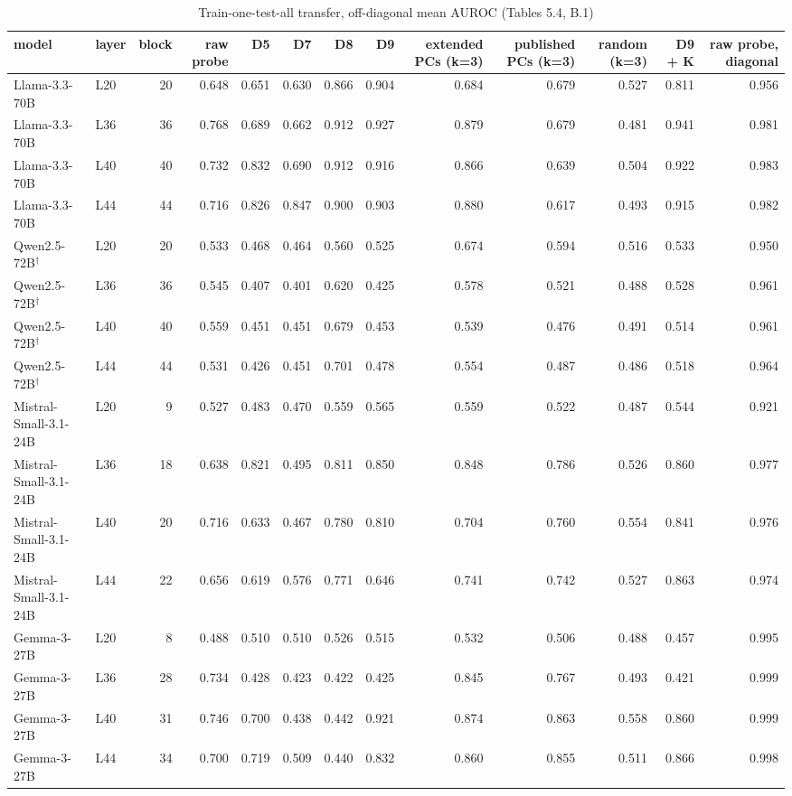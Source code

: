\begin{table}
\caption{Train-one-test-all transfer, off-diagonal mean AUROC (Tables 5.4, B.1)}
\label{tab:x-transfer}
\begin{tabular}{llrrrrrrrrrrr}
\toprule
model & layer & block & raw probe & D5 & D7 & D8 & D9 & extended PCs (k=3) & published PCs (k=3) & random (k=3) & D9 + K & raw probe, diagonal \\
\midrule
Llama-3.3-70B & L20 & 20 & 0.648 & 0.651 & 0.630 & 0.866 & 0.904 & 0.684 & 0.679 & 0.527 & 0.811 & 0.956 \\
Llama-3.3-70B & L36 & 36 & 0.768 & 0.689 & 0.662 & 0.912 & 0.927 & 0.879 & 0.679 & 0.481 & 0.941 & 0.981 \\
Llama-3.3-70B & L40 & 40 & 0.732 & 0.832 & 0.690 & 0.912 & 0.916 & 0.866 & 0.639 & 0.504 & 0.922 & 0.983 \\
Llama-3.3-70B & L44 & 44 & 0.716 & 0.826 & 0.847 & 0.900 & 0.903 & 0.880 & 0.617 & 0.493 & 0.915 & 0.982 \\
Qwen2.5-72B$^\dagger$ & L20 & 20 & 0.533 & 0.468 & 0.464 & 0.560 & 0.525 & 0.674 & 0.594 & 0.516 & 0.533 & 0.950 \\
Qwen2.5-72B$^\dagger$ & L36 & 36 & 0.545 & 0.407 & 0.401 & 0.620 & 0.425 & 0.578 & 0.521 & 0.488 & 0.528 & 0.961 \\
Qwen2.5-72B$^\dagger$ & L40 & 40 & 0.559 & 0.451 & 0.451 & 0.679 & 0.453 & 0.539 & 0.476 & 0.491 & 0.514 & 0.961 \\
Qwen2.5-72B$^\dagger$ & L44 & 44 & 0.531 & 0.426 & 0.451 & 0.701 & 0.478 & 0.554 & 0.487 & 0.486 & 0.518 & 0.964 \\
Mistral-Small-3.1-24B & L20 & 9 & 0.527 & 0.483 & 0.470 & 0.559 & 0.565 & 0.559 & 0.522 & 0.487 & 0.544 & 0.921 \\
Mistral-Small-3.1-24B & L36 & 18 & 0.638 & 0.821 & 0.495 & 0.811 & 0.850 & 0.848 & 0.786 & 0.526 & 0.860 & 0.977 \\
Mistral-Small-3.1-24B & L40 & 20 & 0.716 & 0.633 & 0.467 & 0.780 & 0.810 & 0.704 & 0.760 & 0.554 & 0.841 & 0.976 \\
Mistral-Small-3.1-24B & L44 & 22 & 0.656 & 0.619 & 0.576 & 0.771 & 0.646 & 0.741 & 0.742 & 0.527 & 0.863 & 0.974 \\
Gemma-3-27B & L20 & 8 & 0.488 & 0.510 & 0.510 & 0.526 & 0.515 & 0.532 & 0.506 & 0.488 & 0.457 & 0.995 \\
Gemma-3-27B & L36 & 28 & 0.734 & 0.428 & 0.423 & 0.422 & 0.425 & 0.845 & 0.767 & 0.493 & 0.421 & 0.999 \\
Gemma-3-27B & L40 & 31 & 0.746 & 0.700 & 0.438 & 0.442 & 0.921 & 0.874 & 0.863 & 0.558 & 0.860 & 0.999 \\
Gemma-3-27B & L44 & 34 & 0.700 & 0.719 & 0.509 & 0.440 & 0.832 & 0.860 & 0.855 & 0.511 & 0.866 & 0.998 \\
\bottomrule
\end{tabular}
\end{table}
